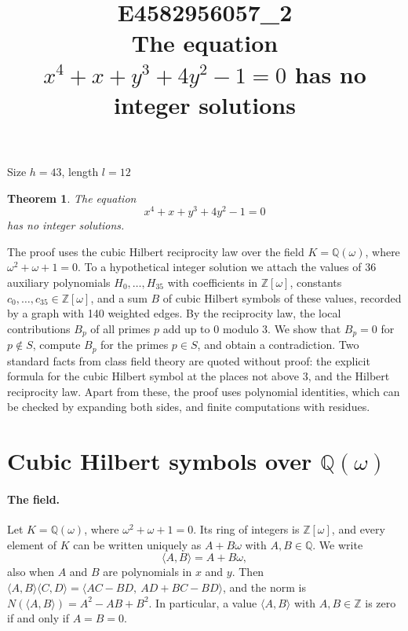 \documentclass[11pt]{article}
\title{\textbf{E4582956057\_2}\\[4pt] {\Large The equation $x^{4}+x+y^{3}+4y^{2}-1=0$ has no integer solutions}}
\author{}
\date{}
\newtheorem{theorem}{Theorem}
\newcommand{\Z}{\mathbb{Z}}
\newcommand{\Q}{\mathbb{Q}}
\begin{document}
\maketitle
\vspace{-8ex}
\begin{center}
Size $h=43$, length $l=12$
\end{center}

\begin{theorem}\label{thm:main}
The equation
\begin{equation}\label{eq:main}
x^{4}+x+y^{3}+4y^{2}-1=0
\end{equation}
has no integer solutions.
\end{theorem}

The proof uses the cubic Hilbert reciprocity law over the field $K=\Q(\omega)$, where $\omega^2+\omega+1=0$. To a hypothetical integer solution we attach the values of 36 auxiliary polynomials $H_0,\dots,H_{35}$ with coefficients in $\Z[\omega]$, constants $c_0,\dots,c_{35}\in\Z[\omega]$, and a sum $B$ of cubic Hilbert symbols of these values, recorded by a graph with 140 weighted edges. By the reciprocity law, the local contributions $B_p$ of all primes $p$ add up to $0$ modulo $3$. We show that $B_p=0$ for $p\notin S$, compute $B_p$ for the primes $p\in S$, and obtain a contradiction. Two standard facts from class field theory are quoted without proof: the explicit formula for the cubic Hilbert symbol at the places not above $3$, and the Hilbert reciprocity law. Apart from these, the proof uses polynomial identities, which can be checked by expanding both sides, and finite computations with residues.


\section{\texorpdfstring{Cubic Hilbert symbols over $\Q(\omega)$}{Cubic Hilbert symbols over Q(w)}}\label{sec:symbols}

\paragraph{The field.} Let $K=\Q(\omega)$, where $\omega^2+\omega+1=0$. Its ring of integers is $\Z[\omega]$, and every element of $K$ can be written uniquely as $A+B\omega$ with $A,B\in\Q$. We write
\[
\langle A,B\rangle=A+B\omega,
\]
also when $A$ and $B$ are polynomials in $x$ and $y$. Then $\langle A,B\rangle\langle C,D\rangle=\langle AC-BD,\ AD+BC-BD\rangle$, and the norm is $N(\langle A,B\rangle)=A^2-AB+B^2$. In particular, a value $\langle A,B\rangle$ with $A,B\in\Z$ is zero if and only if $A=B=0$.
\end{document}
